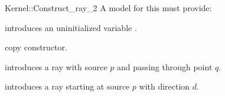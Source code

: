 \begin{ccRefFunctionObjectConcept}{Kernel::Construct_ray_2}
A model for this must provide:



\ccHidden {}
             {introduces an uninitialized variable .}

\ccHidden {}
 	    {copy constructor.}

            {introduces a ray  
             with source $p$ and passing through point $q$.}

            {introduces a ray  starting at source $p$ with 
             direction $d$.}

\end{ccRefFunctionObjectConcept}
